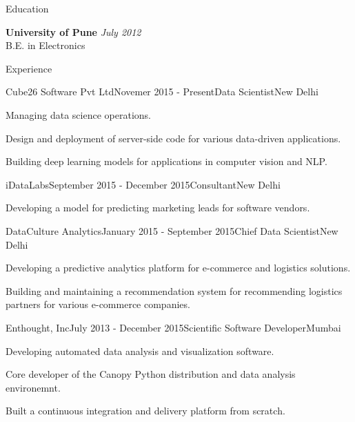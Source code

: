 \documentclass{resume} %
\begin{document}

\begin{rSection}{Education}

{\bf University of Pune} \hfill {\em July 2012} \\ 
B.E. in Electronics

\end{rSection}


\begin{rSection}{Experience}

\begin{rSubsection}{Cube26 Software Pvt Ltd}{Novemer 2015 - Present}{Data
    Scientist}{New Delhi}
\item Managing data science operations.
\item Design and deployment of server-side code for various data-driven
    applications.
\item Building deep learning models for applications in computer vision and
    NLP.
\end{rSubsection}

\begin{rSubsection}{iDataLabs}{September 2015 - December 2015}{Consultant}{New
    Delhi}
\item Developing a model for predicting marketing leads for software vendors.
\end{rSubsection}

\begin{rSubsection}{DataCulture Analytics}{January 2015 - September 2015}{Chief
    Data Scientist}{New Delhi}
\item Developing a predictive analytics platform for e-commerce and logistics
    solutions.
\item Building and maintaining a recommendation system for recommending
    logistics partners for various e-commerce companies.
\end{rSubsection}

\begin{rSubsection}{Enthought, Inc}{July 2013 - December 2015}{Scientific
    Software Developer}{Mumbai}
\item Developing automated data analysis and visualization software.
\item Core developer of the Canopy Python distribution and data analysis
    environemnt.
\item Built a continuous integration and delivery platform from scratch.
\end{rSubsection}


\end{rSection}
\end{document}
